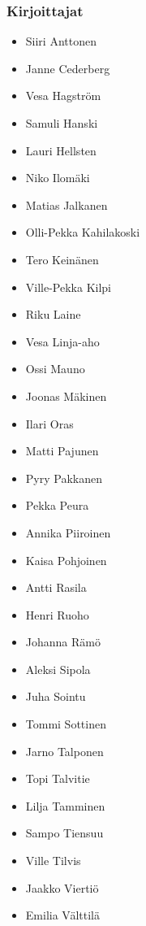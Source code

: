 \subsubsection*{Kirjoittajat}
\begin{itemize}
\item Siiri Anttonen
\item Janne Cederberg
\item Vesa Hagström
\item Samuli Hanski
\item Lauri Hellsten
\item Niko Ilomäki
\item Matias Jalkanen
\item Olli-Pekka Kahilakoski
\item Tero Keinänen
\item Ville-Pekka Kilpi
\item Riku Laine
\item Vesa Linja-aho
\item Ossi Mauno
\item Joonas Mäkinen
\item Ilari Oras
\item Matti Pajunen
\item Pyry Pakkanen
\item Pekka Peura
\item Annika Piiroinen
\item Kaisa Pohjoinen
\item Antti Rasila
\item Henri Ruoho
\item Johanna Rämö
\item Aleksi Sipola
\item Juha Sointu
\item Tommi Sottinen
\item Jarno Talponen
\item Topi Talvitie
\item Lilja Tamminen
\item Sampo Tiensuu
\item Ville Tilvis
\item Jaakko Viertiö
\item Emilia Välttilä
\end{itemize}

\newpage

